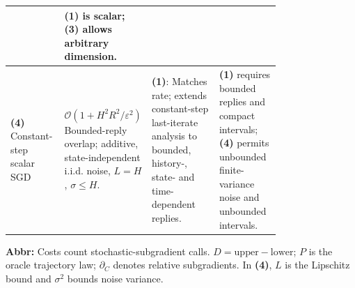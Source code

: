 \begin{table}[tp]
\begin{threeparttable}
\begin{tabularx}{\linewidth}{@{}>{\raggedright\arraybackslash}p{0.20\linewidth}>{\raggedright\arraybackslash}p{0.32\linewidth}>{\raggedright\arraybackslash}p{0.25\linewidth}>{\raggedright\arraybackslash}X@{}}
& \textbf{(1)} is scalar; \textbf{(3)} allows arbitrary dimension. \\
\midrule
\textbf{(4)} Constant-step scalar SGD \citep[Thm.~2, Eq.~(2), v1]{bscBerettaEtAl2026}
& $\mathcal{O}(1+H^2R^2/\varepsilon^2)$\newline Bounded-reply overlap; additive, state-independent i.i.d. noise, $L=H$, $\sigma\le H$.
& \textbf{(1)}: Matches rate; extends constant-step last-iterate analysis to bounded, history-, state- and time-dependent replies.
& \textbf{(1)} requires bounded replies and compact intervals; \textbf{(4)} permits unbounded finite-variance noise and unbounded intervals. \\
\bottomrule
\end{tabularx}
\begin{tablenotes}[flushleft]\footnotesize
\item[] \textbf{Abbr:} Costs count stochastic-subgradient calls. $D=\mathrm{upper}-\mathrm{lower}$; $P$ is the oracle trajectory law; $\partial_C$ denotes relative subgradients. In \textbf{(4)}, $L$ is the Lipschitz bound and $\sigma^2$ bounds noise variance.
\end{tablenotes}
\end{threeparttable}
\end{table}
\clearpage
